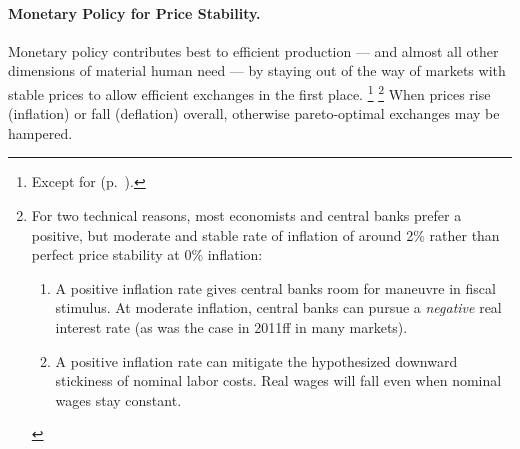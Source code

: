 

\paragraph{Monetary Policy for Price Stability.}
	\label{sec:price-stability}
Monetary policy contributes best to efficient production --- and almost all other dimensions of material human need --- by staying out of the way of markets with stable prices to allow efficient exchanges in the first place.
\footnote{
	Except for  (p.~\pageref{sec:monetary-stimulus}).
}
\footnote{
	For two technical reasons, most economists and central banks prefer a positive, but moderate and stable rate of inflation of around 2\% rather than perfect price stability at 0\% inflation:
	\begin{enumerate}
		\item A positive inflation rate gives central banks room for maneuvre in fiscal stimulus.
		At moderate inflation, central banks can pursue a \emph{negative} real interest rate (as was the case in 2011ff in many markets).
		\item A positive inflation rate can mitigate the hypothesized downward stickiness of nominal labor costs.
		Real wages will fall even when nominal wages stay constant.
	\end{enumerate}
}
When prices rise (inflation) or fall (deflation) overall, otherwise pareto-optimal exchanges may be hampered.

